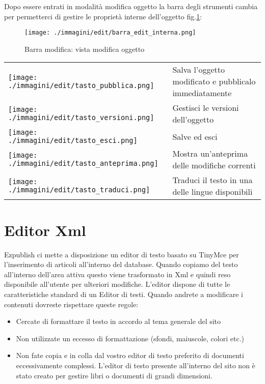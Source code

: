 Dopo essere entrati in modalità modifica oggetto la barra degli strumenti cambia per permetterci di gestire le proprietà interne dell'oggetto fig.\ref{fig:edit_intern}:

\begin{figure}[H]
 \centering
 \texttt{[image: ./immagini/edit/barra\_edit\_interna.png]}
 \caption{Barra modifica: vista modifica oggetto}
 \label{fig:edit_intern}
\end{figure}

\begin{center}
\begin{tabular}{m{}l}
\texttt{[image: ./immagini/edit/tasto\_pubblica.png]}& Salva l'oggetto modificato e pubblicalo immediatamente\\
\texttt{[image: ./immagini/edit/tasto\_versioni.png]}& Gestisci le versioni dell'oggetto\\
\texttt{[image: ./immagini/edit/tasto\_esci.png]}& Salve ed esci\\
\texttt{[image: ./immagini/edit/tasto\_anteprima.png]}& Mostra un'anteprima delle modifiche correnti\\
\texttt{[image: ./immagini/edit/tasto\_traduci.png]}& Traduci il testo in una delle lingue disponibili
\end{tabular}
\end{center}



\section{Editor Xml}

Ezpublish ci mette a disposizione un  editor di testo basato su TinyMce per l'inserimento di articoli all'interno del database. Quando copiamo del testo all'interno dell'area attiva questo viene trasformato in Xml e quindi reso disponibile all'utente per ulteriori modifiche. L'editor dispone di tutte le caratteristiche standard di un Editor di testi. Quando andrete a modificare i contenuti dovreste rispettare queste regole:
\begin{itemize}
\item Cercate di formattare il testo in accordo al tema generale del sito
\item Non utilizzate un eccesso di formattazione (sfondi, maiuscole, colori etc.)
\item Non fate copia e in colla dal vostro editor di testo preferito di documenti eccessivamente complessi. L'editor di testo presente all'interno del sito non è stato creato per gestire libri o documenti di grandi dimensioni.
\end{itemize}

